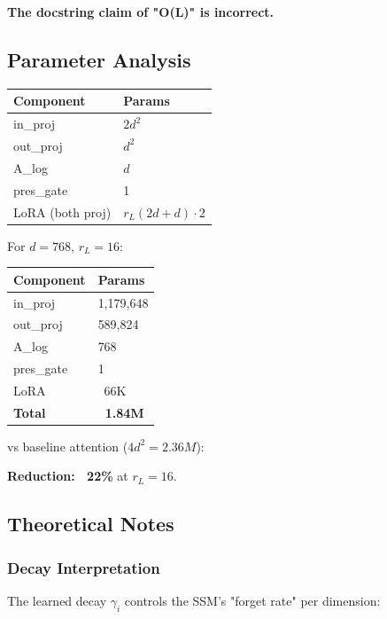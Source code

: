 \textbf{The docstring claim of "O(L)" is incorrect.}

\subsection{Parameter Analysis}

\begin{table}[H]
\centering
\small
\begin{tabular}{ll}
\toprule
\textbf{Component} & \textbf{Params} \\
\midrule
in\_proj & $2 d^2$ \\
out\_proj & $d^2$ \\
A\_log & $d$ \\
pres\_gate & 1 \\
LoRA (both proj) & $r_L (2d + d) \cdot 2$ \\
\bottomrule
\end{tabular}
\end{table}

For $d = 768$, $r_L = 16$:

\begin{table}[H]
\centering
\small
\begin{tabular}{ll}
\toprule
\textbf{Component} & \textbf{Params} \\
\midrule
in\_proj & 1,179,648 \\
out\_proj & 589,824 \\
A\_log & 768 \\
pres\_gate & 1 \\
LoRA & ~66K \\
\textbf{Total} & \textbf{~1.84M} \\
\bottomrule
\end{tabular}
\end{table}

vs baseline attention ($4 d^2 = 2.36M$):

\textbf{Reduction: ~22\%} at $r_L = 16$.

\subsection{Theoretical Notes}

\subsubsection{Decay Interpretation}

The learned decay $\gamma_i$ controls the SSM's "forget rate" per dimension:

